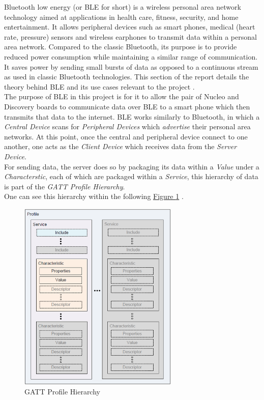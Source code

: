 Bluetooth low energy (or BLE for short) is a wireless personal area network technology aimed at applications in health care, fitness, security, and home entertainment. 
It allows peripheral devices such as smart phones, medical (heart rate, pressure) sensors and wireless earphones to transmit data within a personal area network. 
Compared to the classic Bluetooth, its purpose is to provide reduced power consumption while maintaining a similar range of communication. 
It saves power by sending small bursts of data as opposed to a continuous stream as used in classic Bluetooth technologies. 
This section of the report details the theory behind BLE and its use cases relevant to the project \cite{gatt}.\\

The purpose of BLE in this project is for it to allow the pair of Nucleo and Discovery boards to communicate data over BLE to a smart phone which then transmits that data to the internet. 
BLE works similarly to Bluetooth, in which a \textit{Central Device} scans for \textit{Peripheral Devices} which \textit{advertise} their personal area networks. 
At this point, once the central and peripheral device connect to one another, one acts as the \textit{Client Device} which receives data from the \textit{Server Device}.\\

For sending data, the server does so by packaging its data within a \textit{Value} under a \textit{Characterstic}, each of which are packaged within a \textit{Service}, this hierarchy of data is part of the \textit{GATT Profile Hierarchy}.\\
One can see this hierarchy within the following \hyperref[fig:uiscreenshot]{Figure \ref{fig:gatt}} \cite{gatt}.\\
\begin{figure}[h]
	\caption{GATT Profile Hierarchy}\label{fig:gatt}
	\begin{center}
		\includegraphics[width=3in]{GATT_Profile_Hierarchy.png}
	\end{center}
\end{figure}

